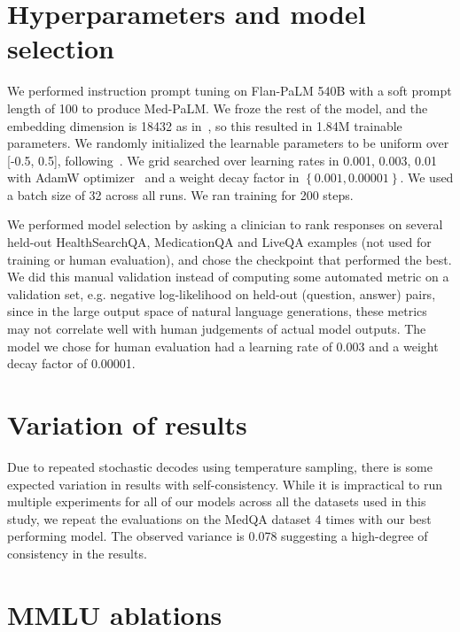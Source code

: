 \section{Hyperparameters and model selection}
\label{appendix:model-selection}
We performed instruction prompt tuning on Flan-PaLM 540B with a soft prompt length of 100 to produce Med-PaLM. We froze the rest of the model, and the embedding dimension is 18432 as in~\citet{chowdhery2022palm}, so this resulted in 1.84M trainable parameters. We randomly initialized the learnable parameters to be uniform over [-0.5, 0.5], following~\citet{lester2021power}. We grid searched over learning rates in {0.001, 0.003, 0.01} with AdamW optimizer~\cite{loshchilov2017decoupled} and a weight decay factor in $\left \{ 0.001, 0.00001 \right \}$. We used a batch size of 32 across all runs. We ran training for 200 steps.

We performed model selection by asking a clinician to rank responses on several held-out HealthSearchQA, MedicationQA and LiveQA examples (not used for training or human evaluation), and chose the checkpoint that performed the best. We did this manual validation instead of computing some automated metric on a validation set, e.g. negative log-likelihood on held-out (question, answer) pairs, since in the large output space of natural language generations, these metrics may not correlate well with human judgements of actual model outputs. The model we chose for human evaluation had a learning rate of 0.003 and a weight decay factor of 0.00001.


\section{Variation of results}
\label{appendix:result-variation}

Due to repeated stochastic decodes using temperature sampling, there is some expected variation in results with self-consistency. While it is impractical to run multiple experiments for all of our models across all the datasets used in this study, we repeat the evaluations on the MedQA dataset 4 times with our best performing model. The observed variance is 0.078 suggesting a high-degree of consistency in the results.




\section{MMLU ablations}
\label{appendix:mmlu-ablations}


